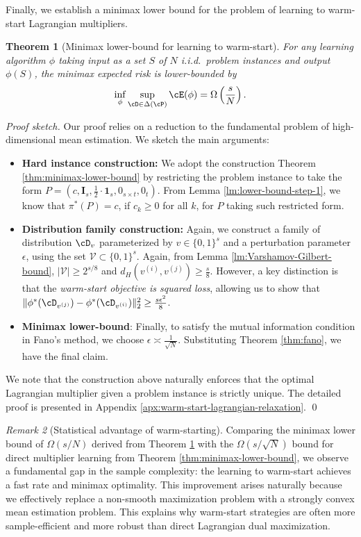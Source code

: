 \documentclass{article}
\theoremstyle{plain}
\newtheorem{theorem}{Theorem}[section]
\theoremstyle{definition}
\theoremstyle{remark}
\newtheorem{remark}[theorem]{Remark}
\begin{document}
Finally, we establish a minimax lower bound for the problem of learning to warm-start Lagrangian multipliers.

\begin{theorem}[Minimax lower-bound for learning to warm-start] \label{thm:minimax-lower-bound-warm-start}
    For any learning algorithm $\phi$ taking input as a set $S$ of $N$ i.i.d.~problem instances and output $\phi(S)$, the minimax expected risk is lower-bounded by
    \[
        \inf_{\phi} \sup_{\cD \in \Delta(\cP)} \cE(\phi) = \Omega\left(\frac{s}{N}\right).
    \]
\end{theorem}
\textit{Proof sketch.}
    Our proof relies on a reduction to the fundamental problem of high-dimensional mean estimation. We sketch the main arguments:
    \begin{itemize}[leftmargin=*]
        \item \textbf{Hard instance construction:} We adopt the construction Theorem \ref{thm:minimax-lower-bound} by restricting the problem instance to take the form $P = (c, \mathbf{I}_s, \frac{1}{2}\cdot \mathbf{1}_s, 0_{s\times t}, 0_{t})$. From Lemma \ref{lm:lower-bound-step-1}, we know that $\pi^*(P) = c$, if $c_k \geq 0$ for all $k$, for $P$ taking such restricted form.
        \item \textbf{Distribution family construction:} Again, we construct a family of distribution $\cD_v$ parameterized by $v \in \{0, 1\}^s$ and a perturbation parameter $\epsilon$, using the set $\mathcal V \subset \{0, 1\}^s$. Again, from Lemma \ref{lm:Varshamov-Gilbert-bound}, $|\mathcal V| \geq 2^{s/8}$ and $d_H(v^{(i)}, v^{(j)}) \geq \frac{s}{8}$. However, a key distinction is that the \textit{warm-start objective is squared loss}, allowing us to show that $\|\phi^*(\cD_{v^{(j)}}) - \phi^*(\cD_{v^{(i)}})\|_2^2 \geq \frac{s\epsilon^2}{8}$. 
        \item \textbf{Minimax lower-bound}: Finally, to satisfy the mutual information condition in Fano's method, we choose $\epsilon \asymp \frac{1}{\sqrt{N}}$. Substituting Theorem \ref{thm:fano}, we have the final claim.
    \end{itemize}
     {We note that the construction above naturally enforces that the optimal Lagrangian multiplier given a problem instance is strictly unique.} The detailed proof is presented in Appendix \ref{apx:warm-start-lagrangian-relaxation}.
\qed
\begin{remark}[Statistical advantage of warm-starting] 
    Comparing the minimax lower bound of $\Omega(s/N)$ derived from Theorem \ref{thm:minimax-lower-bound-warm-start} with the $\Omega(s/\sqrt{N})$ bound for direct multiplier learning from Theorem \ref{thm:minimax-lower-bound}, we observe a fundamental gap in the sample complexity: the learning to warm-start achieves a fast rate and minimax optimality. This improvement arises naturally because we effectively replace a non-smooth maximization problem with a strongly convex mean estimation problem. This explains why warm-start strategies are often more sample-efficient and more robust than direct Lagrangian dual maximization. 
\end{remark}
\end{document}
